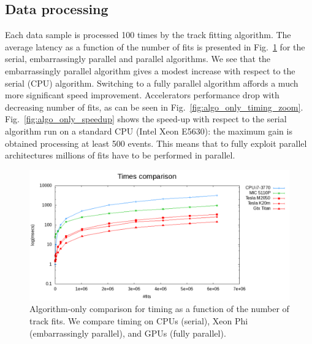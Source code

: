 \documentclass[letterpaper]{jpconf}
\begin{document}
\subsection{Data processing}
Each data sample is processed 100 times by the track fitting algorithm. 
The average latency as a function of the number of fits is presented in 
Fig.~\ref{fig:algo_only_timing} for the serial,
embarrassingly parallel and parallel algorithms. We see that the
embarrassingly parallel algorithm gives a modest increase with respect
to the serial (CPU) algorithm. Switching to a fully parallel algorithm
affords a much more significant speed improvement. 
Accelerators performance drop with decreasing number of fits, as can be seen 
in Fig.~\ref{fig:algo_only_timing_zoom}.
Fig.~\ref{fig:algo_only_speedup} shows the speed-up with respect to the serial 
algorithm run on a standard CPU (Intel Xeon E5630): the maximum gain is 
obtained processing at least 500 events. This means that to fully exploit 
parallel architectures millions of fits have to be performed in parallel.  


%

 \begin{figure}[!tbp]
    \centering
    \includegraphics[width=0.9\linewidth]{figures/TimeComp_MIC.pdf}
     \caption{Algorithm-only comparison for timing as a function of the
      number of track fits. We compare timing on CPUs (serial), Xeon Phi
      (embarrassingly parallel), and GPUs (fully parallel). }
    \label{fig:algo_only_timing}
  \end{figure}
 
\end{document}
